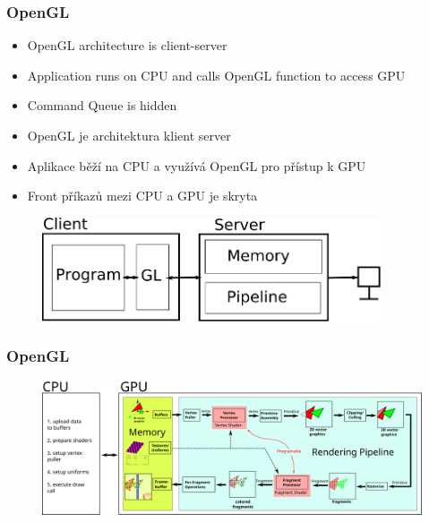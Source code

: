 \begin{frame}\frametitle{OpenGL}
\scriptsize
\begin{itemize}
  \item OpenGL architecture is client-server
  \item Application runs on CPU and calls OpenGL function to access GPU
  \item Command Queue is hidden
\end{itemize}

\begin{itemize}
  \item OpenGL je architektura klient server
  \item Aplikace běží na CPU a využívá OpenGL pro přístup k GPU
  \item Front příkazů mezi CPU a GPU je skryta
\end{itemize}
\begin{figure}[h]
  \includegraphics[width=10cm,keepaspectratio]{pics/opengl/clientserver}
\end{figure}
\end{frame}

\begin{frame}
\frametitle{OpenGL}
\begin{figure}[h]
	\includegraphics[width=14cm,keepaspectratio]{pics/opengl/RenderingPipeline}
\end{figure}
\end{frame}

